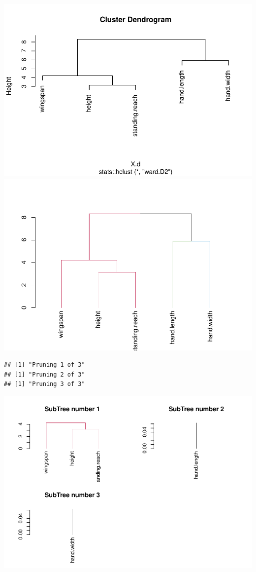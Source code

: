 \documentclass[]{article}
\begin{document}
\includegraphics{project-measure-writeup_files/figure-latex/hclust-measure-1.pdf}
\includegraphics{project-measure-writeup_files/figure-latex/hclust-measure-2.pdf}

\begin{verbatim}
## [1] "Pruning 1 of 3"
## [1] "Pruning 2 of 3"
## [1] "Pruning 3 of 3"
\end{verbatim}

\includegraphics{project-measure-writeup_files/figure-latex/hclust-measure-3.pdf}
\end{document}

